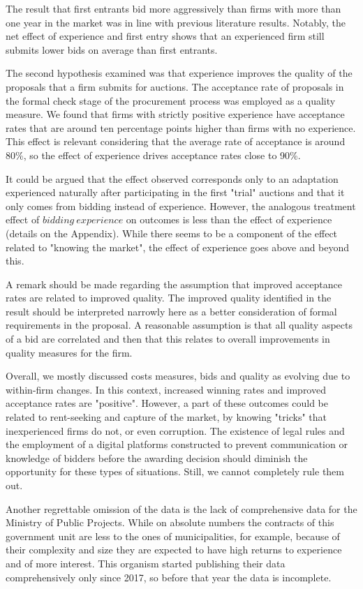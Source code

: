 The result that first entrants bid more aggressively than firms with more than one year in the market was in line with previous literature results. Notably, the net effect of experience and first entry shows that an experienced firm still submits lower bids on average than first entrants.

The second hypothesis examined was that experience improves the quality of the proposals that a firm submits for auctions. The acceptance rate of proposals in the formal check stage of the procurement process was employed as a quality measure. We found that firms with strictly positive experience have acceptance rates that are around ten percentage points higher than firms with no experience. This effect is relevant considering that the average rate of acceptance is around 80\%, so the effect of experience drives acceptance rates close to 90\%.

It could be argued that the effect observed corresponds only to an adaptation experienced naturally after participating in the first "trial" auctions and that it only comes from bidding instead of experience. However, the analogous treatment effect of $bidding \ experience$ on outcomes is less than the effect of experience (details on the Appendix). While there seems to be a component of the effect related to "knowing the market", the effect of experience goes above and beyond this.

A remark should be made regarding the assumption that improved acceptance rates are related to improved quality. The improved quality identified in the result should be interpreted narrowly here as a better consideration of formal requirements in the proposal. A reasonable assumption is that all quality aspects of a bid are correlated and then that this relates to overall improvements in quality measures for the firm.

Overall, we mostly discussed costs measures, bids and quality as evolving due to within-firm changes. In this context, increased winning rates and improved acceptance rates are "positive". However, a part of these outcomes could be related to rent-seeking and capture of the market, by knowing "tricks" that inexperienced firms do not, or even corruption. The existence of legal rules  and the employment of a digital platforms constructed to prevent communication or knowledge of bidders before the awarding decision should diminish the opportunity for these types of situations. Still, we cannot completely rule them out.

Another regrettable omission of the data is the lack of comprehensive data for the Ministry of Public Projects. While on absolute numbers the contracts of this government unit are less to the ones of municipalities, for example, because of their complexity and size they are expected to have high returns to experience and of more interest. This organism started publishing their data comprehensively only since 2017, so before that year the data is incomplete.


